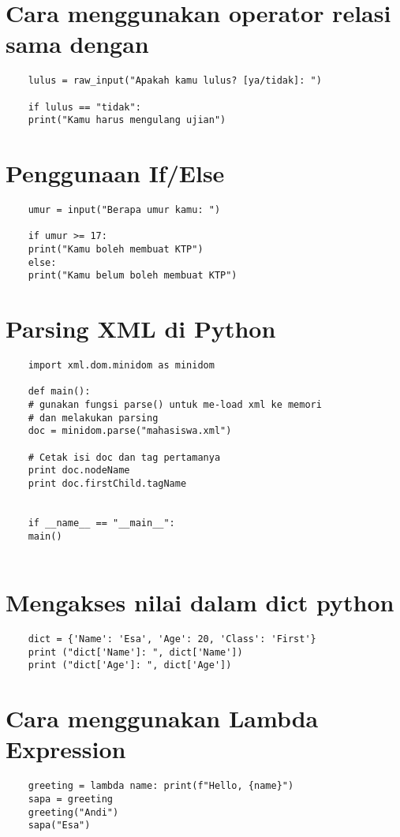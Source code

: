 \documentclass[12pt]{article} %
\begin{document}
\section{Cara menggunakan operator relasi sama dengan}
\begin{lstlisting}
	lulus = raw_input("Apakah kamu lulus? [ya/tidak]: ")
	
	if lulus == "tidak":
	print("Kamu harus mengulang ujian")
\end{lstlisting}

\section{Penggunaan If/Else}
\begin{lstlisting}
	umur = input("Berapa umur kamu: ")
	
	if umur >= 17:
	print("Kamu boleh membuat KTP")
	else:
	print("Kamu belum boleh membuat KTP")
\end{lstlisting}

\section{Parsing XML di Python}
\begin{lstlisting}
	import xml.dom.minidom as minidom
	
	def main():
	# gunakan fungsi parse() untuk me-load xml ke memori 
	# dan melakukan parsing
	doc = minidom.parse("mahasiswa.xml")
	
	# Cetak isi doc dan tag pertamanya
	print doc.nodeName
	print doc.firstChild.tagName
	
	
	if __name__ == "__main__":
	main()
	
\end{lstlisting}

\section{Mengakses nilai dalam dict python}
\begin{lstlisting}
	dict = {'Name': 'Esa', 'Age': 20, 'Class': 'First'}
	print ("dict['Name']: ", dict['Name'])
	print ("dict['Age']: ", dict['Age'])
\end{lstlisting}

\section{Cara menggunakan Lambda Expression}
\begin{lstlisting}
	greeting = lambda name: print(f"Hello, {name}")
	sapa = greeting
	greeting("Andi")
	sapa("Esa")
\end{lstlisting}
\end{document}
